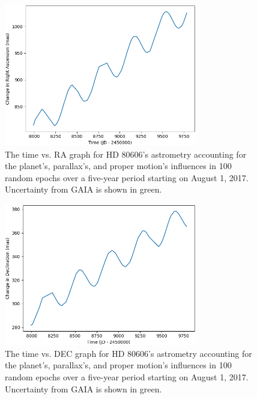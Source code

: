 \documentclass[12pt]{article}
\begin{document}
\begin{figure}[H]
\centering
\includegraphics[width=0.75\textwidth]{proper_time_ra.png}
\vspace{-1em}
\caption{The time vs. RA graph for HD 80606's astrometry accounting for the planet's, parallax's, and proper motion's influences in 100 random epochs over a five-year period starting on August 1, 2017. Uncertainty from GAIA is shown in green.}
\end{figure}
\vspace{-1em}
\begin{figure}[H]
\centering
\includegraphics[width=0.75\textwidth]{proper_time_dec.png}
\vspace{-1em}
\caption{The time vs. DEC graph for HD 80606's astrometry accounting for the planet's, parallax's, and proper motion's influences in 100 random epochs over a five-year period starting on August 1, 2017. Uncertainty from GAIA is shown in green.}
\end{figure}
\vspace{-1em}
\end{document}
